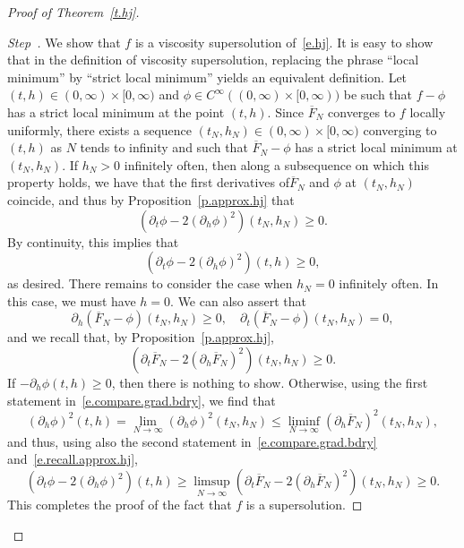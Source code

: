 \documentclass[AHL,Unicode,longabstracts,published]{cedram}
\newcommand{\1}{\mathds{1}}
\renewcommand{\le}{\leqslant}
\renewcommand{\ge}{\geqslant}
\renewcommand{\bar}{\overline}
\newcounter{stepcount}
\newenvironment{step}{\refstepcounter{stepcount}\begin{proof}[Step~\thestepcount]}{\let\qed\relax\end{proof}}
\begin{document}
\begin{proof}[Proof of Theorem~\ref{t.hj}]
\setcounter{stepcount}{0}
\begin{step}\label{prooftheo2.1step1}
We show that $f$ is a viscosity supersolution of~\eqref{e.hj}. It is easy to show that in the definition of viscosity supersolution, replacing the phrase ``local minimum'' by ``strict local minimum'' yields an equivalent definition. Let $(t,h) \in (0,\infty)\times [0,\infty)$ and $\phi \in C^\infty((0,\infty)\times [0,\infty))$ be such that $f-\phi$ has a strict local minimum at the point $(t,h)$. Since $\bar F_N$ converges to $f$ locally uniformly, there exists a sequence $(t_N,h_N) \in (0,\infty)\times [0,\infty)$ converging to $(t,h)$ as $N$ tends to infinity and such that $\bar F_N - \phi$ has a strict local minimum at $(t_N,h_N)$. If $h_N > 0$ infinitely often, then along a subsequence on which this property holds, we have that the first derivatives of\linebreak$\bar F_N$ and $\phi$ at $(t_N,h_N)$ coincide, and thus by Proposition~\ref{p.approx.hj} that
\[
\left(\partial_t \phi - 2 (\partial_h \phi)^2 \right)(t_N,h_N) \ge 0.
\]
By continuity, this implies that
\[
\left(\partial_t \phi - 2 (\partial_h \phi)^2 \right)(t,h) \ge 0,
\]
as desired. There remains to consider the case when $h_N = 0$ infinitely often. In this case, we must have $h = 0$. We can also assert that
\begin{equation}\label{e.compare.grad.bdry}
\partial_h \left(\bar F_N - \phi\right)(t_N,h_N) \ge 0, \quad \partial_t \left(\bar F_N - \phi\right)(t_N,h_N) = 0,
\end{equation}
and we recall that, by Proposition~\ref{p.approx.hj},
\begin{equation}\label{e.recall.approx.hj}
\left(\partial_t \bar F_N - 2 \left(\partial_h \bar F_N\right)^2 \right)(t_N,h_N) \ge 0.
\end{equation}
If $-\partial_h\phi(t,h) \ge 0$, then there is nothing to show. Otherwise, using the first statement in~\eqref{e.compare.grad.bdry}, we find that
\[
(\partial_h \phi)^2(t,h) = \lim_{N \to \infty} (\partial_h \phi)^2(t_N,h_N) \le \liminf_{N \to \infty} \left(\partial_h \bar F_N\right)^2(t_N,h_N),
\]
and thus, using also the second statement in~\eqref{e.compare.grad.bdry} and~\eqref{e.recall.approx.hj},
\[
\left(\partial_t \phi - 2 (\partial_h \phi)^2 \right)(t,h) \ge \limsup_{N\to \infty} \left(\partial_t \bar F_N - 2 \left(\partial_h \bar F_N\right)^2 \right)(t_N,h_N) \ge 0.
\]
This completes the proof of the fact that $f$ is a supersolution.
\end{step}


\end{proof}
\end{document}
